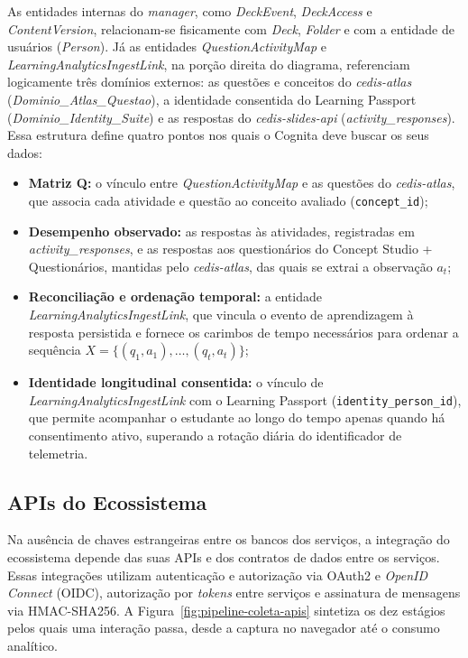 As entidades internas do \textit{manager}, como \textit{DeckEvent}, \textit{DeckAccess} e \textit{ContentVersion}, relacionam-se fisicamente com \textit{Deck}, \textit{Folder} e com a entidade de usuários (\textit{Person}). Já as entidades \textit{QuestionActivityMap} e \textit{LearningAnalyticsIngestLink}, na porção direita do diagrama, referenciam logicamente três domínios externos: as questões e conceitos do \textit{cedis-atlas} (\textit{Dominio\_Atlas\_Questao}), a identidade consentida do Learning Passport (\textit{Dominio\_Identity\_Suite}) e as respostas do \textit{cedis-slides-api} (\textit{activity\_responses}). Essa estrutura define quatro pontos nos quais o Cognita deve buscar os seus dados:

\begin{itemize}
    \item \textbf{Matriz Q:} o vínculo entre \textit{QuestionActivityMap} e as questões do \textit{cedis-atlas}, que associa cada atividade e questão ao conceito avaliado (\texttt{concept\_id});
    \item \textbf{Desempenho observado:} as respostas às atividades, registradas em \textit{activity\_\allowbreak responses}, e as respostas aos questionários do Concept Studio + Questionários, mantidas pelo \textit{cedis-atlas}, das quais se extrai a observação $a_t$;
    \item \textbf{Reconciliação e ordenação temporal:} a entidade \textit{LearningAnalyticsIngestLink}, que vincula o evento de aprendizagem à resposta persistida e fornece os carimbos de tempo necessários para ordenar a sequência $X = \{(q_1, a_1), \ldots, (q_t, a_t)\}$;
    \item \textbf{Identidade longitudinal consentida:} o vínculo de \textit{LearningAnalyticsIngestLink} com o Learning Passport (\texttt{identity\_person\_id}), que permite acompanhar o estudante ao longo do tempo apenas quando há consentimento ativo, superando a rotação diária do identificador de telemetria.
\end{itemize}

\subsection{APIs do Ecossistema}
\label{subsec:apis-ecossistema}

Na ausência de chaves estrangeiras entre os bancos dos serviços, a integração do ecossistema depende das suas APIs e dos contratos de dados entre os serviços. Essas integrações utilizam autenticação e autorização via OAuth2 e \textit{OpenID Connect} (OIDC), autorização por \textit{tokens} entre serviços e assinatura de mensagens via HMAC-SHA256. A Figura~\ref{fig:pipeline-coleta-apis} sintetiza os dez estágios pelos quais uma interação passa, desde a captura no navegador até o consumo analítico.


